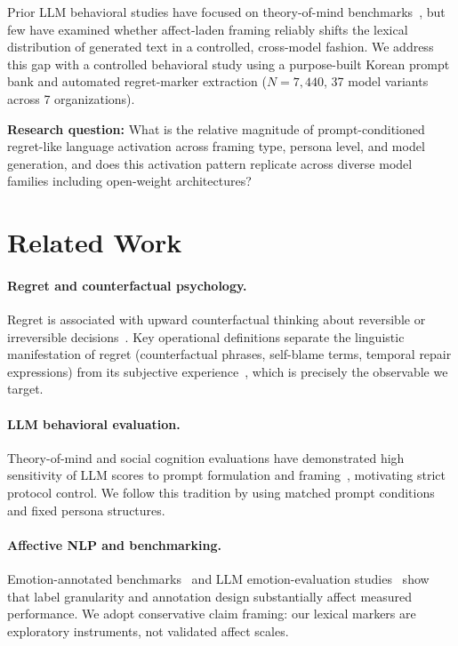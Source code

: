 \documentclass[11pt]{article}
\begin{document}
Prior LLM behavioral studies have focused on theory-of-mind benchmarks~\citep{kosinski2024tom, tombench2024}, but few have examined whether affect-laden framing reliably shifts the lexical distribution of generated text in a controlled, cross-model fashion.
We address this gap with a controlled behavioral study using a purpose-built Korean prompt bank and automated regret-marker extraction ($N=7{,}440$, 37 model variants across 7 organizations).

\textbf{Research question:} What is the relative magnitude of prompt-conditioned regret-like language activation across framing type, persona level, and model generation, and does this activation pattern replicate across diverse model families including open-weight architectures?

\section{Related Work}

\paragraph{Regret and counterfactual psychology.}
Regret is associated with upward counterfactual thinking about reversible or irreversible decisions~\citep{roese2017, byrne2016, kahneman1986norm}.
Key operational definitions separate the linguistic manifestation of regret (counterfactual phrases, self-blame terms, temporal repair expressions) from its subjective experience~\citep{bell1982, loomes1982, zeelenberg1998, gilovichmedvec1995}, which is precisely the observable we target.

\paragraph{LLM behavioral evaluation.}
Theory-of-mind and social cognition evaluations have demonstrated high sensitivity of LLM scores to prompt formulation and framing~\citep{ullman2023, shapira2023cleverhans, schaeffer2023mirage}, motivating strict protocol control.
We follow this tradition by using matched prompt conditions and fixed persona structures.

\paragraph{Affective NLP and benchmarking.}
Emotion-annotated benchmarks~\citep{rashkin2019, demszky2020} and LLM emotion-evaluation studies~\citep{emobench2024, fragileemotionreasoning2025} show that label granularity and annotation design substantially affect measured performance.
We adopt conservative claim framing: our lexical markers are exploratory instruments, not validated affect scales.
\end{document}
